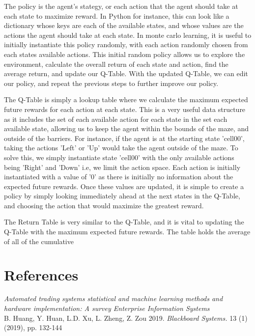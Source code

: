\documentclass[letterpaper]{article}
\begin{document}
The policy is the agent's stategy, or each action that the agent should take at each state to maximize reward. In Python for instance, this can look like a dictionary whose keys are each of the available states, and whose values are the actions the agent should take at each state. In monte carlo learning, it is useful to initially instantiate this policy randomly, with each action randomly chosen from each states available actions. This initial random policy allows us to explore the environment, calculate the overall return of each state and action, find the average return, and update our Q-Table. With the updated Q-Table, we can edit our policy, and repeat the previous steps to further improve our policy. 

The Q-Table is simply a lookup table where we calculate the maximum expected future rewards for each action at each state. This is a very useful data structure as it includes the set of each available action for each state in the set each available state, allowing us to keep the agent within the bounds of the maze, and outside of the barriers. For instance, if the agent is at the starting state 'cell00', taking the actions 'Left' or 'Up' would take the agent outside of the maze. To solve this, we simply instantiate state 'cell00' with the only available actions being 'Right' and 'Down' i.e, we limit the action space. Each action is initially instantiated with a value of '0' as there is initially no information about the expected future rewards. Once these values are updated, it is simple to create a policy by simply looking immediately ahead at the next states in the Q-Table, and choosing the action that would maximize the greatest reward.

The Return Table is very similar to the Q-Table, and it is vital to updating the Q-Table with the maximum expected future rewards. The table holds the average of all of the cumulative

\section{References}
\smallskip \noindent \textit{Automated trading systems statistical and machine learning methods and hardware implementation: A survey Enterprise Information Systems}\\
B. Huang, Y. Huan, L.D. Xu, L. Zheng, Z. Zou 2019. \textit{Blackboard Systems.} 13 (1) (2019), pp. 132-144
\end{document}
